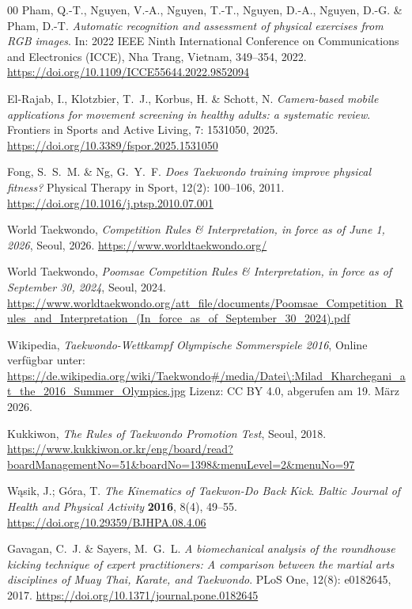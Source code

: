 \documentclass[intern]{cgMA}
\begin{document}
\begin{thebibliography}{00}
Pham, Q.-T., Nguyen, V.-A., Nguyen, T.-T., Nguyen, D.-A.,
Nguyen, D.-G. \& Pham, D.-T.
\textit{Automatic recognition and assessment of physical
exercises from RGB images}.
In: 2022 IEEE Ninth International Conference on Communications
and Electronics (ICCE), Nha Trang, Vietnam, 349--354, 2022.
\href{https://doi.org/10.1109/ICCE55644.2022.9852094}{https://doi.org/10.1109/ICCE55644.2022.9852094}

El-Rajab, I., Klotzbier, T.~J., Korbus, H. \& Schott, N.
\textit{Camera-based mobile applications for movement
screening in healthy adults: a systematic review}.
Frontiers in Sports and Active Living, 7: 1531050, 2025.
\href{https://doi.org/10.3389/fspor.2025.1531050}{https://doi.org/10.3389/fspor.2025.1531050}

Fong, S.~S.~M. \& Ng, G.~Y.~F.
\textit{Does Taekwondo training improve physical fitness?}
Physical Therapy in Sport, 12(2): 100--106, 2011.
\href{https://doi.org/10.1016/j.ptsp.2010.07.001}{https://doi.org/10.1016/j.ptsp.2010.07.001}

World Taekwondo,
\textit{Competition Rules \& Interpretation, in force as of June 1, 2026},
Seoul, 2026.
\url{https://www.worldtaekwondo.org/}

World Taekwondo,
\textit{Poomsae Competition Rules \& Interpretation,
in force as of September 30, 2024},
Seoul, 2024.
\url{https://www.worldtaekwondo.org/att\_file/documents/Poomsae\_Competition\_Rules\_and\_Interpretation\_(In\_force\_as\_of\_September\_30\_2024).pdf}

Wikipedia,
\textit{Taekwondo-Wettkampf Olympische Sommerspiele 2016},
Online verfügbar unter:
\url{https://de.wikipedia.org/wiki/Taekwondo#/media/Datei\:Milad\_Kharchegani\_at\_the\_2016\_Summer\_Olympics.jpg}
Lizenz: CC BY 4.0,
abgerufen am 19. März 2026.

Kukkiwon,
\textit{The Rules of Taekwondo Promotion Test},
Seoul, 2018.
\url{https://www.kukkiwon.or.kr/eng/board/read?boardManagementNo=51&boardNo=1398&menuLevel=2&menuNo=97}

Wąsik, J.; Góra, T.
\textit{The Kinematics of Taekwon-Do Back Kick}.
\textit{Baltic Journal of Health and Physical Activity} \textbf{2016}, 8(4), 49--55.
\href{https://doi.org/10.29359/BJHPA.08.4.06}{https://doi.org/10.29359/BJHPA.08.4.06}

Gavagan, C.~J. \& Sayers, M.~G.~L.
\textit{A biomechanical analysis of the roundhouse kicking technique
of expert practitioners: A comparison between the martial arts
disciplines of Muay Thai, Karate, and Taekwondo}.
PLoS One, 12(8): e0182645, 2017.
\href{https://doi.org/10.1371/journal.pone.0182645}{https://doi.org/10.1371/journal.pone.0182645}


\end{thebibliography}
\end{document}
